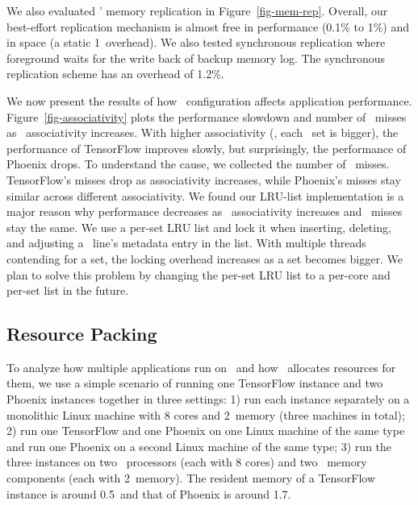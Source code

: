 \documentclass[10pt,times,twocolumn]{z2-article}
\begin{document}
{{{{{{{We also evaluated \lego{}' memory replication in Figure~\ref{fig-mem-rep}.
Overall, our best-effort replication mechanism is almost free in performance (0.1\% to 1\%) and in space (a static 1\MB\ overhead).
We also tested synchronous replication where foreground waits for the write back of backup memory log.
The synchronous replication scheme has an overhead of 1.2\%.


We now present the results of how \excache\ configuration affects application performance.
Figure~\ref{fig-associativity} plots the performance slowdown and number of \excache\ misses as \excache\ associativity increases.
With higher associativity (\ie, each \excache\ set is bigger), the performance of TensorFlow improves slowly,
but surprisingly, the performance of Phoenix drops.
To understand the cause, we collected the number of \excache\ misses. 
TensorFlow's misses drop as associativity increases, 
while Phoenix's misses stay similar across different associativity.
We found our LRU-list implementation is a major reason why performance decreases as \excache\ associativity increases and \excache\ misses stay the same.
We use a per-set LRU list and lock it when inserting, deleting, and adjusting a \excache\ line's metadata entry in the list.
With multiple threads contending for a set, the locking overhead increases as a set becomes bigger.
We plan to solve this problem by changing the per-set LRU list to a per-core and per-set list in the future.

\subsection{Resource Packing}
\label{sec:cost}
To analyze how multiple applications run on \lego\ and how \lego\ allocates resources for them,
we use a simple scenario of running one TensorFlow instance and two Phoenix instances together in three settings:
1) run each instance separately on a monolithic Linux machine with 8 cores and 2\GB\ memory (three machines in total);
2) run one TensorFlow and one Phoenix on one Linux machine of the same type and 
run one Phoenix on a second Linux machine of the same type;
3) run the three instances on two \lego\ processors (each with 8 cores) and two \lego\ memory components (each with 2\GB\ memory).
The resident memory of a TensorFlow instance is around 0.5\GB\ and that of Phoenix is around 1.7\GB.

}}}}}}}
\end{document}
